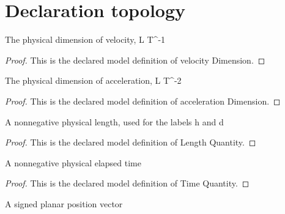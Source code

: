 \section{Declaration topology}
\begin{definition}
  \label{def:physics:phyx-mini-0745:phyxminiproblems-problemphyxmini0745-velocitydimension}
  The physical dimension of velocity, L T\textasciicircum{}-1
\end{definition}
\begin{proof}
  This is the declared model definition of velocity Dimension.
\end{proof}
\begin{definition}
  \label{def:physics:phyx-mini-0745:phyxminiproblems-problemphyxmini0745-accelerationdimension}
  The physical dimension of acceleration, L T\textasciicircum{}-2
\end{definition}
\begin{proof}
  This is the declared model definition of acceleration Dimension.
\end{proof}
\begin{definition}
  \label{def:physics:phyx-mini-0745:phyxminiproblems-problemphyxmini0745-lengthquantity}
  A nonnegative physical length, used for the labels h and d
\end{definition}
\begin{proof}
  This is the declared model definition of Length Quantity.
\end{proof}
\begin{definition}
  \label{def:physics:phyx-mini-0745:phyxminiproblems-problemphyxmini0745-timequantity}
  A nonnegative physical elapsed time
\end{definition}
\begin{proof}
  This is the declared model definition of Time Quantity.
\end{proof}
\begin{definition}
  \label{def:physics:phyx-mini-0745:phyxminiproblems-problemphyxmini0745-planarpositionquantity}
  A signed planar position vector
\end{definition}
